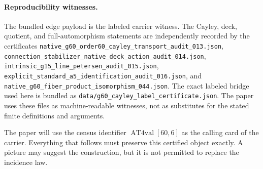 \paragraph{Reproducibility witnesses.}
The bundled edge payload is the labeled carrier witness.  The Cayley,
deck, quotient, and full-automorphism statements are independently recorded
by the certificates
\texttt{native\_g60\_order60\_cayley\_transport\_audit\_013.json},
\texttt{connection\_stabilizer\_native\_deck\_action\_audit\_014.json},
\texttt{intrinsic\_g15\_line\_petersen\_audit\_015.json},
\texttt{explicit\_standard\_a5\_identification\_audit\_016.json}, and
\texttt{native\_g60\_fiber\_product\_isomorphism\_044.json}.  The exact labeled bridge used here is bundled
as \texttt{data/g60\_cayley\_label\_certificate.json}.
The paper uses these files as machine-readable witnesses, not as substitutes
for the stated finite definitions and arguments.

The paper will use the census identifier
\(\operatorname{AT4val}[60,6]\) as the calling card of the carrier.
Everything that follows must preserve this certified object exactly.  A
picture may suggest the construction, but it is not permitted to replace
the incidence law.

